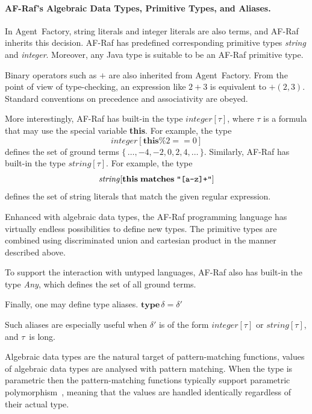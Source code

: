 \documentclass[a4paper,12pt,oneside,fleqn]{book} %
\newcommand{\todo}[1]{[\textcolor{red}{TODO}: #1]}
\begin{document}
{\paragraph{AF-Raf's Algebraic Data Types, Primitive Types, and Aliases.}
In Agent~Factory, string literals and integer literals are
also terms, and AF-Raf inherits this decision. AF-Raf has
predefined corresponding primitive types \textit{string} and
\textit{integer}. Moreover, any Java type is suitable to be an AF-Raf
primitive type.

Binary operators such as $+$ are also inherited from Agent~Factory. From
the point of view of type-checking, an expression like $2+3$ is equivalent
to $+(2,3)$. Standard conventions on precedence and associativity are
obeyed.

More interestingly, AF-Raf has built-in the type $\mathit{integer}[\tau]$,
where $\tau$ is a formula that may use the special variable \textbf{this}.
For example, the type \[\mathit{integer}[\mathbf{this}\%2==0]\] defines the
set of ground terms $\{\,\ldots,-4,-2,0,2,4,\ldots\,\}$. Similarly, AF-Raf
has built-in the type $\mathit{string}[\tau]$. For example, the type
\[\mathit{string}[\mathbf{this}\;\mathbf{matches}\;\verb|"[a-z]+"|]\]
defines the set of string literals that match the given regular expression.

Enhanced with algebraic data types, the AF-Raf programming language has
virtually endless possibilities to define new types. The primitive types
are combined using discriminated union and cartesian product in the manner
described above.

To support the interaction with untyped languages, AF-Raf also has built-in
the type \textit{Any}, which defines the set of all ground terms.

Finally, one may define type aliases.
$\mathbf{type}\,\delta=\delta'$

Such aliases are especially useful when $\delta'$ is of the form
$\mathit{integer}[\tau]$ or $\mathit{string}[\tau]$, and $\tau$~is long.


Algebraic data types are the natural target of pattern-matching functions,
values of algebraic data types are analysed with pattern matching.  When
the type is parametric then the pattern-matching functions typically
support parametric polymorphism~\cite{AlgebraicDT09}, meaning that the
values are handled identically regardless of their actual type.

}
\end{document}
